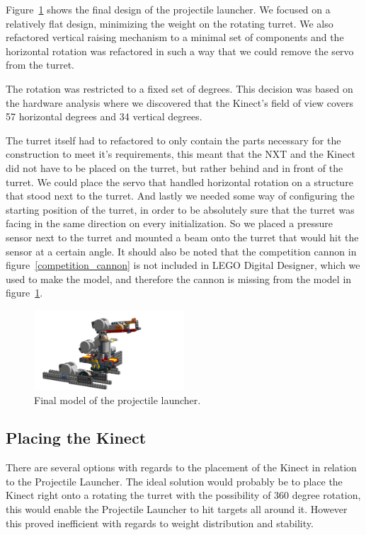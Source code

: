 Figure~\ref{final_model} shows the final design of the projectile launcher. We focused on a relatively flat design, minimizing the weight on the rotating turret. We also refactored vertical raising mechanism to a minimal set of components and the horizontal rotation was refactored in such a way that we could remove the servo from the turret. 

The rotation was restricted to a fixed set of degrees. This decision was based on the hardware analysis where we discovered that the Kinect's field of view covers 57 horizontal degrees and 34 vertical degrees. 

The turret itself had to refactored to only contain the parts necessary for the construction to meet it's requirements, this meant that the NXT and the Kinect did not have to be placed on the turret, but rather behind and in front of the turret. We could place the servo that handled horizontal rotation on a structure that stood next to the turret. And lastly we needed some way of configuring the starting position of the turret, in order to be absolutely sure that the turret was facing in the same direction on every initialization. So we placed a pressure sensor next to the turret and mounted a beam onto the turret that would hit the sensor at a certain angle. It should also be noted that the competition cannon in figure~\ref{competition_cannon} is not included in LEGO Digital Designer, which we used to make the model, and therefore the cannon is missing from the model in figure~\ref{final_model}.
\begin{figure}[hptb]
  \centering
    \includegraphics[width=0.5\textwidth]{img/design_turret4.png}
  \caption{Final model of the projectile launcher.}
  \label{final_model}
\end{figure}

\subsection{Placing the Kinect} %
\label{sub:placing_the_kinect}
There are several options with regards to the placement of the Kinect in relation to the Projectile Launcher. The ideal solution would probably be to place the Kinect right onto a rotating the turret with the possibility of 360 degree rotation, this would enable the Projectile Launcher to hit targets all around it. However this proved inefficient with regards to weight distribution and stability.

